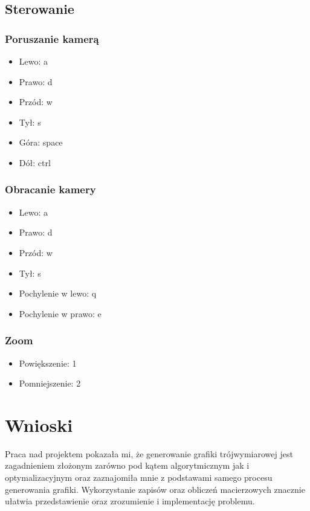 \documentclass[11pt]{article}
\begin{document}
\subsection{Sterowanie}
\subsubsection{Poruszanie kamerą}
    \begin{itemize}
        \item Lewo: a
        \item Prawo: d
        \item Przód: w
        \item Tył: s
        \item Góra: space
        \item Dół: ctrl
    \end{itemize}
\subsubsection{Obracanie kamery}
    \begin{itemize}
        \item Lewo: a
        \item Prawo: d
        \item Przód: w
        \item Tył: s
        \item Pochylenie w lewo: q
        \item Pochylenie w prawo: e
    \end{itemize}
\subsubsection{Zoom}
    \begin{itemize}
        \item Powiększenie: 1
        \item Pomniejszenie: 2
    \end{itemize}
\section{Wnioski}
Praca nad projektem pokazała mi, że generowanie grafiki trójwymiarowej jest zagadnieniem złożonym 
zarówno pod kątem algorytmicznym jak i optymalizacyjnym oraz zaznajomiła mnie z podstawami
samego procesu generowania grafiki. Wykorzystanie zapisów oraz obliczeń
macierzowych znacznie ułatwia przedstawienie oraz zrozumienie i implementację problemu.
\end{document}
